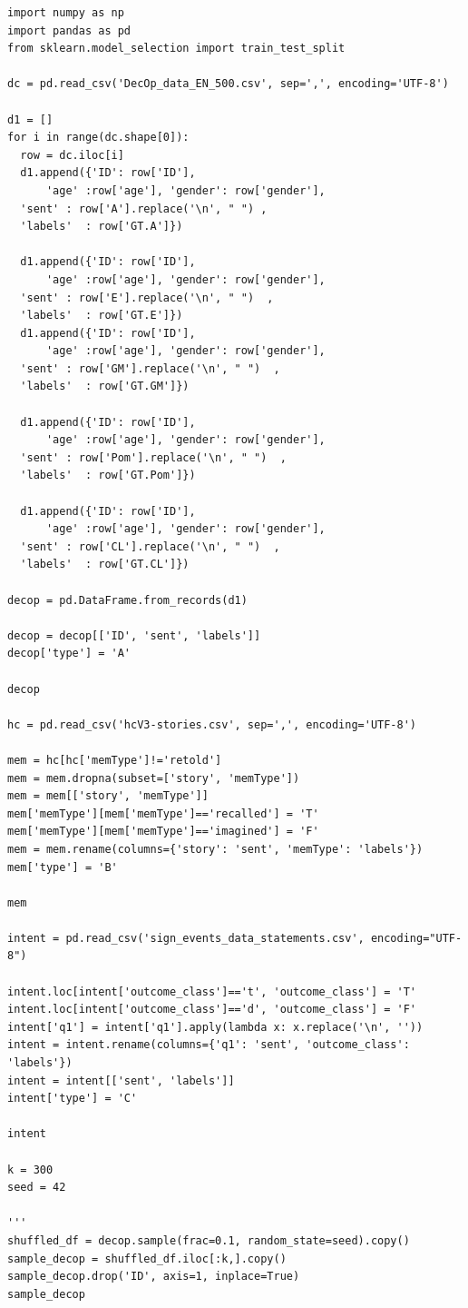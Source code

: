 \documentclass[10pt,twocolumn,letterpaper]{article}
\begin{document}
\begin{verbatim}
import numpy as np
import pandas as pd
from sklearn.model_selection import train_test_split

dc = pd.read_csv('DecOp_data_EN_500.csv', sep=',', encoding='UTF-8')

d1 = []
for i in range(dc.shape[0]):
  row = dc.iloc[i]
  d1.append({'ID': row['ID'],
      'age' :row['age'], 'gender': row['gender'],
  'sent' : row['A'].replace('\n', " ") ,
  'labels'  : row['GT.A']})

  d1.append({'ID': row['ID'],
      'age' :row['age'], 'gender': row['gender'],
  'sent' : row['E'].replace('\n', " ")  ,
  'labels'  : row['GT.E']})
  d1.append({'ID': row['ID'],
      'age' :row['age'], 'gender': row['gender'],
  'sent' : row['GM'].replace('\n', " ")  ,
  'labels'  : row['GT.GM']})

  d1.append({'ID': row['ID'],
      'age' :row['age'], 'gender': row['gender'],
  'sent' : row['Pom'].replace('\n', " ")  ,
  'labels'  : row['GT.Pom']})

  d1.append({'ID': row['ID'],
      'age' :row['age'], 'gender': row['gender'],
  'sent' : row['CL'].replace('\n', " ")  ,
  'labels'  : row['GT.CL']})

decop = pd.DataFrame.from_records(d1)

decop = decop[['ID', 'sent', 'labels']]
decop['type'] = 'A'

decop

hc = pd.read_csv('hcV3-stories.csv', sep=',', encoding='UTF-8')

mem = hc[hc['memType']!='retold']
mem = mem.dropna(subset=['story', 'memType'])
mem = mem[['story', 'memType']]
mem['memType'][mem['memType']=='recalled'] = 'T'
mem['memType'][mem['memType']=='imagined'] = 'F'
mem = mem.rename(columns={'story': 'sent', 'memType': 'labels'})
mem['type'] = 'B'

mem

intent = pd.read_csv('sign_events_data_statements.csv', encoding="UTF-8")

intent.loc[intent['outcome_class']=='t', 'outcome_class'] = 'T'
intent.loc[intent['outcome_class']=='d', 'outcome_class'] = 'F'
intent['q1'] = intent['q1'].apply(lambda x: x.replace('\n', ''))
intent = intent.rename(columns={'q1': 'sent', 'outcome_class': 'labels'})
intent = intent[['sent', 'labels']]
intent['type'] = 'C'

intent

k = 300
seed = 42

'''
shuffled_df = decop.sample(frac=0.1, random_state=seed).copy()
sample_decop = shuffled_df.iloc[:k,].copy()
sample_decop.drop('ID', axis=1, inplace=True)
sample_decop


\end{verbatim}
\end{document}

